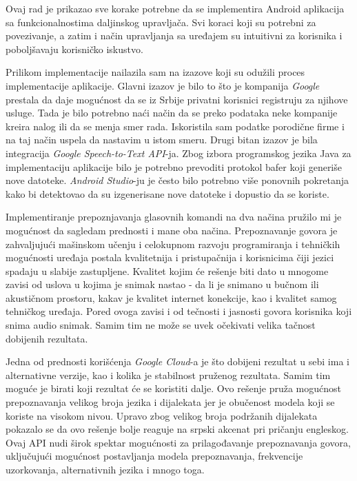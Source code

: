 \documentclass[TamaraIvanovicMasterRad.tex]{subfiles}
\begin{document}
Ovaj rad je prikazao sve korake potrebne da se implementira Android aplikacija sa funkcionalnostima daljinskog upravljača. Svi koraci koji su potrebni za povezivanje, a zatim i način upravljanja sa uređajem su intuitivni za korisnika i poboljšavaju korisničko iskustvo.

Prilikom implementacije nailazila sam na izazove koji su odužili proces implementacije aplikacije. Glavni izazov je bilo to što je kompanija \textit{Google} prestala da daje mogućnost da se iz Srbije privatni korisnici registruju za njihove usluge. Tada je bilo potrebno naći način da se preko podataka neke kompanije kreira nalog ili da se menja smer rada. Iskoristila sam podatke porodične firme i na taj način uspela da nastavim u istom smeru. Drugi bitan izazov je bila integracija \textit{Google Speech-to-Text API}-ja. Zbog izbora programskog jezika Java za implementaciju aplikacije bilo je potrebno prevoditi protokol bafer koji generiše nove datoteke. \textit{Android Studio}-ju je često bilo potrebno više ponovnih pokretanja kako bi detektovao da su izgenerisane nove datoteke i dopustio da se koriste. 

Implementiranje prepoznjavanja glasovnih komandi na dva načina pružilo mi je mogućnost da sagledam prednosti i mane oba načina. Prepoznavanje govora je zahvaljujući mašinskom učenju i celokupnom razvoju programiranja i tehničkih mogućnosti uređaja postala kvalitetnija i pristupačnija i korisnicima čiji jezici spadaju u slabije zastupljene. Kvalitet kojim će rešenje biti dato u mnogome zavisi od uslova u kojima je snimak nastao - da li je snimano u bučnom ili akustičnom prostoru, kakav je kvalitet internet konekcije, kao i kvalitet samog tehničkog uređaja. Pored ovoga zavisi i od tečnosti i jasnosti govora korisnika koji snima audio snimak. Samim tim ne može se uvek očekivati velika tačnost dobijenih rezultata.

Jedna od prednosti korišćenja \textit{Google Cloud}-a je što dobijeni rezultat u sebi ima i alternativne verzije, kao i kolika je stabilnost pruženog rezultata. Samim tim moguće je birati koji rezultat će se koristiti dalje. Ovo rešenje pruža mogućnost prepoznavanja velikog broja jezika i dijalekata jer je obučenost modela koji se koriste na visokom nivou. Upravo zbog velikog broja podržanih dijalekata pokazalo se da ovo rešenje bolje reaguje na srpski akcenat pri pričanju engleskog. Ovaj API nudi širok spektar mogućnosti za prilagođavanje prepoznavanja govora, uključujući mogućnost postavljanja modela prepoznavanja, frekvencije uzorkovanja, alternativnih jezika i mnogo toga. 
\end{document}
